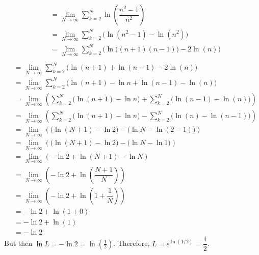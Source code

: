 \documentclass[11pt,letterpaper]{article}
\begin{document}
\begin{enumerate}
\[\begin{aligned}
	&= \lim_{N \to \infty} \sum_{k=2}^N \ln \left( \dfrac{n^2 - 1}{n^2} \right) \\
	&= \lim_{N \to \infty} \sum_{k=2}^N \big( \ln(n^2 - 1) - \ln(n^2) \big) \\
	&= \lim_{N \to \infty} \sum_{k=2}^N \big( \ln \big( (n + 1)(n - 1) \big) - 2\ln(n) \big) \\
	\end{aligned}
	\]
	\[
	\begin{aligned}
	&= \lim_{N \to \infty} \sum_{k=2}^N \big( \ln(n + 1) + \ln(n - 1) - 2\ln(n) \big) \\
	&= \lim_{N \to \infty} \sum_{k=2}^N \big( \ln(n + 1) - \ln n + \ln(n - 1) - \ln(n) \big) \\
	&= \lim_{N \to \infty} \left( \sum_{k=2}^N \big( \ln(n + 1) - \ln n \big) + \sum_{k=2}^N \big( \ln(n - 1) - \ln(n) \big) \right) \\
	&= \lim_{N \to \infty} \left( \sum_{k=2}^N \big( \ln(n + 1) - \ln n \big) - \sum_{k=2}^N \big( \ln(n) - \ln(n - 1) \big) \right) \\
	&= \lim_{N \to \infty} \left( \big( \ln(N+1) - \ln 2 \big) - \big( \ln N - \ln(2 - 1) \big) \right) \\
	&= \lim_{N \to \infty} \left( \big( \ln(N+1) - \ln 2 \big) - \big( \ln N - \ln 1 \big) \right) \\
	&= \lim_{N \to \infty} \left( -\ln 2 + \ln(N + 1) - \ln N \right) \\
	&= \lim_{N \to \infty} \left( -\ln 2 + \ln \left( \dfrac{N + 1}{N} \right) \right) \\
	&= \lim_{N \to \infty} \left( -\ln 2 + \ln \left( 1 + \dfrac{1}{N} \right) \right) \\
	&= -\ln 2 + \ln(1+ 0) \\
	&= -\ln 2 + \ln(1) \\
	&= -\ln 2
	\end{aligned}
	\]
But then $\ln L= -\ln 2= \ln \left(\frac{1}{2} \right)$. Therefore, $L= e^{\ln(1/2)}= \dfrac{1}{2}$. \pspace


\end{enumerate}
\end{document}
